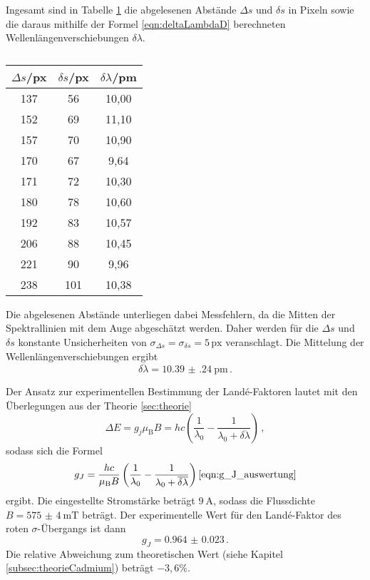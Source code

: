 Ingesamt sind in Tabelle \ref{tab:rot} die abgelesenen Abstände $\Delta s$ und $\delta s$ in Pixeln sowie die daraus mithilfe der Formel \eqref{eqn:deltaLambdaD} berechneten Wellenlängenverschiebungen $\delta \lambda$.

\begin{table}[htp]
	\begin{center}
    \caption{\cite{insert caption}}
    \label{tab:rot}
		\begin{tabular}{ccc}
		\toprule
			{$\Delta s$/px} & {$\delta s$/px} & {$\delta \lambda$/pm}\\
			\midrule
			137 &  56 & 10,00\\
			152 &  69 & 11,10\\
			157 &  70 & 10,90\\
			170 &  67 &  9,64\\
			171 &  72 & 10,30\\
			180 &  78 & 10,60\\
			192 &  83 & 10,57\\
			206 &  88 & 10,45\\
			221 &  90 &  9,96\\
			238 & 101 & 10,38\\
		\bottomrule
		\end{tabular}
	\end{center}
\end{table}

Die abgelesenen Abstände unterliegen dabei Messfehlern, da die Mitten der Spektrallinien mit dem Auge abgeschätzt werden. Daher werden für die $\Delta s$ und $\delta s$ konstante Unsicherheiten von $\sigma_{\Delta s} = \sigma_{\delta s}= 5\,\text{px}$ veranschlagt.
\cite{Insert Fehlerfortpflanzung delta lamb}
Die Mittelung der Wellenlängenverschiebungen ergibt
\begin{equation*}
  \overline{\delta \lambda} = \SI{10.39(24)}{\pico\meter}\,.
\end{equation*}

Der Ansatz zur experimentellen Bestimmung der Landé-Faktoren lautet mit den Überlegungen aus der Theorie \ref{sec:theorie}
\begin{equation*}
  \Delta E = g_j \mu_\text{B} B = hc \left (\frac{1}{\lambda_0} - \frac{1}{\lambda_0+\overline{\delta \lambda}}\right)\,,
\end{equation*}
sodass sich die Formel
\begin{equation}
  g_J = \frac{hc}{\mu_\text{B} B} \left (\frac{1}{\lambda_0} - \frac{1}{\lambda_0+\overline{\delta \lambda}}\right)
  \eqref{eqn:g_J_auswertung}
\end{equation}
ergibt.
Die eingestellte Stromstärke beträgt $\SI{9}{\ampere}$, sodass die Flussdichte $B = \SI{575(4)}{\milli\tesla}$ beträgt.
Der experimentelle Wert für den Landé-Faktor des roten $\sigma$-Übergangs ist dann
\begin{equation*}
  g_J = \num{0.964(23)}\,.
\end{equation*}
Die relative Abweichung zum theoretischen Wert (siehe Kapitel \ref{subsec:theorieCadmium}) beträgt $-3{,}6\%$.

